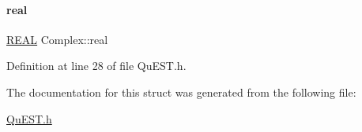 \paragraph{\texorpdfstring{real}{real}}
{\footnotesize\ttfamily \mbox{\hyperlink{QuEST__precision_8h_a4b654506f18b8bfd61ad2a29a7e38c25}{R\+E\+AL}} Complex\+::real}



Definition at line 28 of file Qu\+E\+S\+T.\+h.



The documentation for this struct was generated from the following file\+:\begin{DoxyCompactItemize}
\item 
\mbox{\hyperlink{QuEST_8h}{Qu\+E\+S\+T.\+h}}\end{DoxyCompactItemize}
